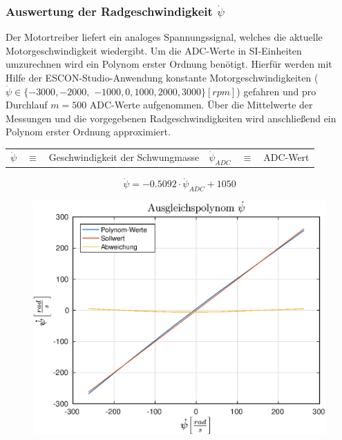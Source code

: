 \subsubsection{Auswertung der Radgeschwindigkeit $\dot{\psi}$}
Der Motortreiber liefert ein analoges Spannungssignal, welches die aktuelle Motorgeschwindigkeit wiedergibt. Um die ADC-Werte in SI-Einheiten umzurechnen wird ein Polynom erster Ordnung benötigt. Hierfür werden mit Hilfe der ESCON-Studio-Anwendung konstante Motorgeschwindigkeiten ($\dot{\psi} \in \{ -3000, -2000,$  $-1000, 0, 1000, 2000, 3000 \} [rpm] $) gefahren und pro Durchlauf $m=500$ ADC-Werte aufgenommen. Über die Mittelwerte der Messungen und die vorgegebenen Radgeschwindigkeiten wird anschließend ein Polynom erster Ordnung approximiert.
\begin{table}[h!]
\centering
\begin{tabular}{lcllcl}
$\dot{\psi}$ & $\equiv$ & Geschwindigkeit der Schwungmasse & $\dot{\psi}_{ADC}$ & $\equiv$ & ADC-Wert
\end{tabular}
\end{table}
\vspace*{-\baselineskip}
\begin{equation}
\dot{\psi} = -0.5092 \cdot \dot{\psi}_{ADC} + 1050
\end{equation}
\vspace*{-\baselineskip}
\begin{figure}[h!]
\centering
	\includegraphics[width=0.5\linewidth]{img/ADC_mittelwert_polynom.eps}
\end{figure}
